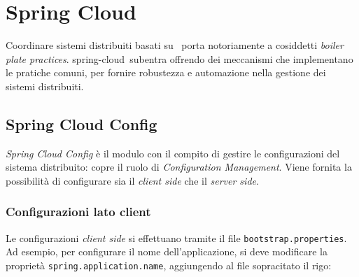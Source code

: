 
\chapter{Spring Cloud}\label{cap:spring-cloud}



\bigskip

Coordinare sistemi distribuiti basati su \gloss\ porta notoriamente a cosiddetti \textit{boiler plate practices}. \gls{spring-cloud}\gloss\ subentra offrendo dei meccanismi che implementano le pratiche comuni, per fornire robustezza e automazione nella gestione dei sistemi distribuiti.

\clearpage


\section{Spring Cloud Config}

\textit{Spring Cloud Config} è il modulo con il compito di gestire le configurazioni del sistema distribuito: copre il ruolo di \textit{Configuration Management}.
Viene fornita la possibilità di configurare sia il \textit{client side} che il \textit{server side}.

\subsection{Configurazioni lato client} Le configurazioni \textit{client side} si effettuano tramite
il file \texttt{bootstrap.properties}. Ad esempio, per configurare il nome dell'applicazione, si deve
modificare la proprietà \texttt{spring.application.name}, aggiungendo al file sopracitato il rigo:


